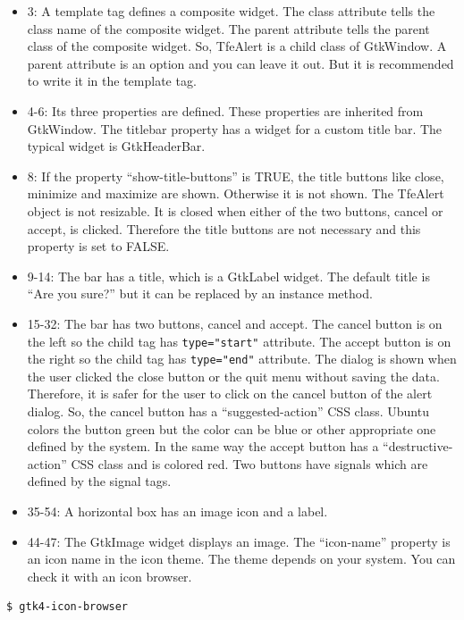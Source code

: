 \begin{itemize}
\tightlist
\item
  3: A template tag defines a composite widget. The class attribute
  tells the class name of the composite widget. The parent attribute
  tells the parent class of the composite widget. So, TfeAlert is a
  child class of GtkWindow. A parent attribute is an option and you can
  leave it out. But it is recommended to write it in the template tag.
\item
  4-6: Its three properties are defined. These properties are inherited
  from GtkWindow. The titlebar property has a widget for a custom title
  bar. The typical widget is GtkHeaderBar.
\item
  8: If the property ``show-title-buttons'' is TRUE, the title buttons
  like close, minimize and maximize are shown. Otherwise it is not
  shown. The TfeAlert object is not resizable. It is closed when either
  of the two buttons, cancel or accept, is clicked. Therefore the title
  buttons are not necessary and this property is set to FALSE.
\item
  9-14: The bar has a title, which is a GtkLabel widget. The default
  title is ``Are you sure?'' but it can be replaced by an instance
  method.
\item
  15-32: The bar has two buttons, cancel and accept. The cancel button
  is on the left so the child tag has
  \passthrough{\lstinline!type="start"!} attribute. The accept button is
  on the right so the child tag has \passthrough{\lstinline!type="end"!}
  attribute. The dialog is shown when the user clicked the close button
  or the quit menu without saving the data. Therefore, it is safer for
  the user to click on the cancel button of the alert dialog. So, the
  cancel button has a ``suggested-action'' CSS class. Ubuntu colors the
  button green but the color can be blue or other appropriate one
  defined by the system. In the same way the accept button has a
  ``destructive-action'' CSS class and is colored red. Two buttons have
  signals which are defined by the signal tags.
\item
  35-54: A horizontal box has an image icon and a label.
\item
  44-47: The GtkImage widget displays an image. The ``icon-name''
  property is an icon name in the icon theme. The theme depends on your
  system. You can check it with an icon browser.
\end{itemize}

\begin{lstlisting}
$ gtk4-icon-browser
\end{lstlisting}

